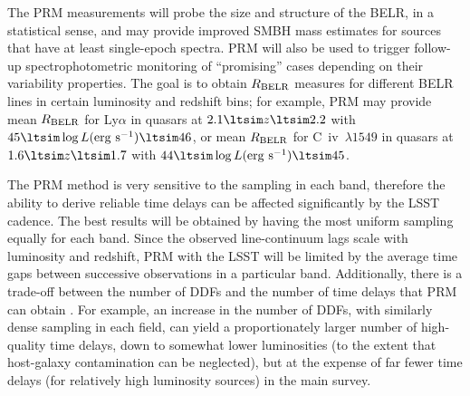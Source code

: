 The PRM measurements will probe the size and structure of the BELR,
in a statistical sense, and may provide improved SMBH mass estimates
for sources that have at least single-epoch spectra. PRM will also be
used to trigger follow-up spectrophotometric monitoring of ``promising''
cases depending on their variability properties. The goal is to obtain
$R_{\rm BELR}$ measures for different BELR lines in certain luminosity
and redshift bins; for example, PRM may provide mean $R_{\rm BELR}$ for
Ly$\alpha$ in quasars at $2.1\ltsim z \ltsim 2.2$ with
$45 \ltsim \log L ({\rm erg~s}^{-1}) \ltsim 46$, or mean $R_{\rm BELR}$
for C~{\sc iv}~$\lambda 1549$ in quasars at $1.6\ltsim z \ltsim 1.7$
with $44 \ltsim \log L ({\rm erg~s}^{-1}) \ltsim 45$.

The PRM method is very sensitive to the sampling in each band,
therefore the ability to derive reliable time delays can be affected
significantly by the LSST cadence. The best results will be obtained
by having the most uniform sampling equally for each band.
%
Since the observed line-continuum lags scale with luminosity and redshift,
PRM with the LSST will be limited by the average time gaps between successive
observations in a particular band.
%
Additionally, there is a trade-off between the number of DDFs and the
number of time delays that PRM can obtain \citep{CheloucheEtal2014}.
For example, an increase in the number of DDFs, with similarly dense
sampling in each field, can yield a proportionately larger number of
high-quality time delays, down to somewhat lower luminosities (to the
extent that host-galaxy contamination can be neglected), but at the
expense of far fewer time delays (for relatively high luminosity
sources) in the main survey.

